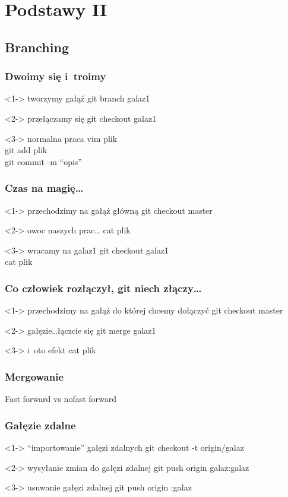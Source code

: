\documentclass[10pt]{beamer}
\begin{document}
\section{Podstawy II}
\subsection{Branching}
\begin{frame}
	\frametitle{Dwoimy się i~troimy}	
	\begin{block}<1->
	{tworzymy gałąź}
	git branch galaz1
	\end{block}
	\begin{block}<2->
	{przełączamy się}
	git checkout galaz1
	\end{block}
	\begin{block}<3->
	{normalna praca}
	vim plik\\
	git add plik\\
	git commit -m ``opis''
	\end{block}
\end{frame}
\begin{frame}
	\frametitle{Czas na magię\ldots}
	\begin{block}<1->
	{przechodzimy na gałąź główną}
	git checkout master
	\end{block}
	\begin{block}<2->
	{owoc naszych prac\ldots}
	cat plik
	\end{block}
	\begin{block}<3->
	{wracamy na galaz1}
	git checkout galaz1\\
	cat plik
	\end{block}
\end{frame}
\begin{frame}
	\frametitle{Co człowiek rozłączył, git niech złączy\ldots}
	\begin{block}<1->
	{przechodzimy na gałąź do której chcemy dołączyć}
	git checkout master
	\end{block}
	\begin{block}<2->
	{gałęzie\ldots łączcie się}
	git merge galaz1
	\end{block}
	\begin{block}<3->
	{i~oto efekt}
	cat plik
	\end{block}
\end{frame}
\begin{frame}
	\frametitle{Mergowanie}
	Fast forward vs no\dywiz fast forward
\end{frame}
\begin{frame}
	\frametitle{Gałęzie zdalne}
	\begin{block}<1->
	{``importowanie'' gałęzi zdalnych}
	git checkout -t origin/galaz
	\end{block}
	\begin{block}<2->
	{wysyłanie zmian do gałęzi zdalnej}
	git push origin galaz:galaz
	\end{block}
	\begin{block}<3->
	{usuwanie gałęzi zdalnej}
	git push origin :galaz
	\end{block}
\end{frame}
\end{document}
